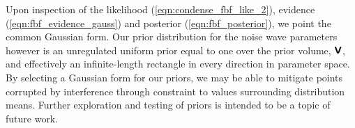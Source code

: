 Upon inspection of the likelihood (\cref{eqn:condense_fbf_like_2}), evidence (\cref{eqn:fbf_evidence_gauss}) and posterior (\cref{eqn:fbf_posterior}), we point the common Gaussian form. Our prior distribution for the noise wave parameters however is an unregulated uniform prior equal to one over the prior volume, $\textbf{\textsf{V}}$, and effectively an infinite-length rectangle in every direction in parameter space. By selecting a Gaussian form for our priors, we may be able to mitigate points corrupted by interference through constraint to values surrounding distribution means. Further exploration and testing of priors is intended to be a topic of future work. 
